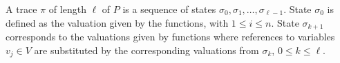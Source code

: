 \begin{definition}
A trace $\pi$ of length $\ell$ of $P$ is a sequence 
of \caig states $\sigma_0,\sigma_1,\ldots,\sigma_{\ell -1}$. 
State $\sigma_0$ is defined as the valuation given by 
the  functions, with $1 \le i \le n$. 
State $\sigma_{k+1}$ corresponds to the valuations 
given by functions  
where references to variables $v_j\in V$ are substituted by 
the corresponding valuations from $\sigma_{k}$, 
$0\le k \le \ell$. 
\end{definition}


